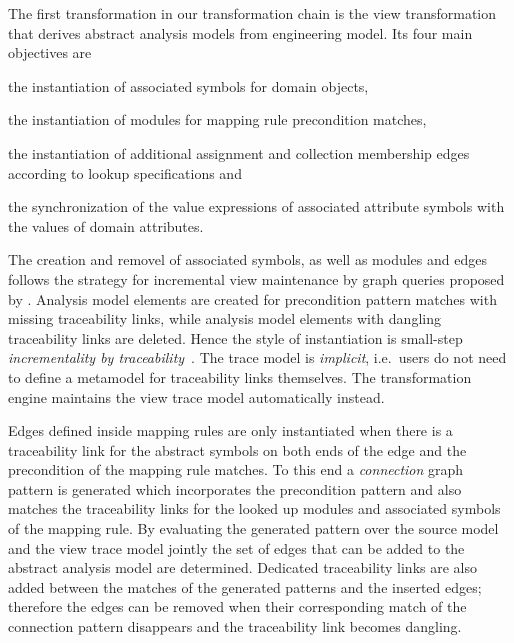 The first transformation in our transformation chain is the view transformation that derives abstract  analysis models from engineering model. Its four main objectives are
\begin{itemize*}
\item the instantiation of associated symbols for domain objects,
\item the instantiation of  modules for mapping rule precondition matches,
\item the instantiation of additional assignment and collection membership edges according to lookup specifications and
\item the synchronization of the value expressions of associated attribute symbols with the values of domain attributes.
\end{itemize*}

The creation and removel of associated symbols, as well as  modules and edges follows the strategy for incremental view maintenance by graph queries proposed by \citet{Debreceni14viewmodel}. Analysis model elements are created for precondition pattern matches with missing traceability links, while analysis model elements with dangling traceability links are deleted. Hence the style of instantiation is small-step \emph{incrementality by traceability}~\citep{Varro15styles}. The trace model is \emph{implicit}, i.e.~users do not need to define a metamodel for traceability links themselves. The transformation engine maintains the view trace model automatically instead.

Edges defined inside mapping rules are only instantiated when there is a traceability link for the abstract  symbols on both ends of the edge and the precondition of the mapping rule matches. To this end a \emph{connection} graph pattern is generated which incorporates the precondition pattern and  also matches the traceability links for the looked up  modules and associated symbols of the mapping rule. By evaluating the generated pattern over the source model and the view trace model jointly the set of edges that can be added to the abstract analysis model are determined. Dedicated traceability links are also added between the matches of the generated patterns and the inserted edges; therefore the edges can be removed when their corresponding match of the connection pattern disappears and the traceability link becomes dangling.

